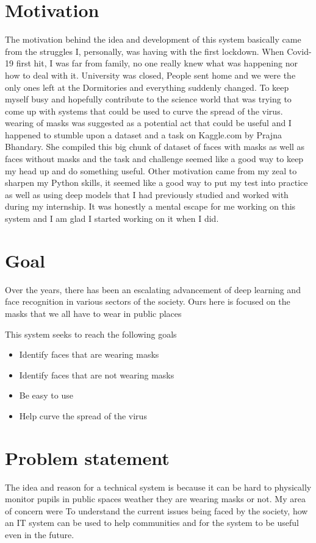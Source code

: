 \section*{Motivation}
The motivation behind the idea and development of this system basically came from the struggles I, personally, was having with the first lockdown. When Covid-19 first hit, I was far from family, no one really knew what was happening nor how to deal with it. University was closed, People sent home and we were the only ones left at the Dormitories and everything suddenly changed. To keep myself busy and hopefully contribute to the science world that was trying to come up with systems that could be used to curve the spread of the virus. wearing of masks was suggested as a potential act that could be useful and I happened to stumble upon a dataset and a task on Kaggle.com by Prajna Bhandary. She compiled this big chunk of dataset of faces with masks as well as faces without masks and the task and challenge seemed like a good way to keep my head up and do something useful. Other motivation came from my zeal to sharpen my Python skills, it seemed like a good way to put my test into practice as well as using deep models that I had previously studied and worked with during my internship. It was honestly a mental escape for me working on this system and I am glad I started working on it when I did.

\section*{Goal}
Over the years, there has been an escalating advancement of deep learning and face recognition in various sectors of the society. Ours here is focused on the masks that we all have to wear in public places

This system seeks to reach the following goals 
\begin{itemize}
    \item Identify faces that are wearing masks
    \item Identify faces that are not wearing masks
    \item Be easy to use
    \item Help curve the spread of the virus
\end{itemize}

\section*{Problem statement}

The idea and reason for a technical system is because it can be hard to physically monitor pupils in public spaces weather they are wearing masks or not. My area of concern were To understand the current issues being faced by the society, how an IT system can be used to help communities and for the system to be useful even in the future.